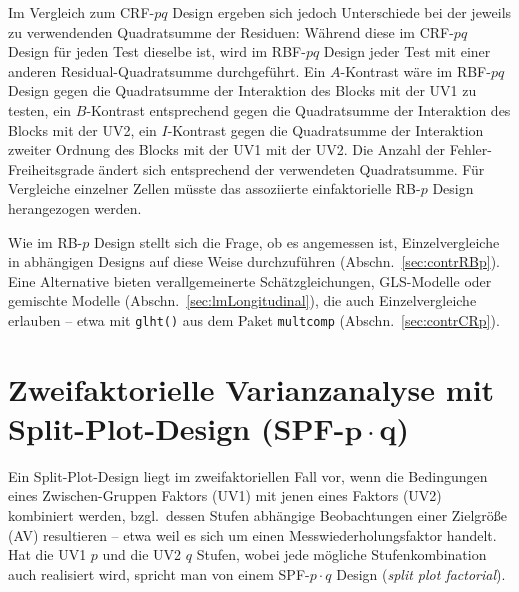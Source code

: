Im Vergleich zum CRF-$pq$ Design ergeben sich jedoch Unterschiede bei der jeweils zu verwendenden Quadratsumme der Residuen: Während diese im CRF-$pq$ Design für jeden Test dieselbe ist, wird im RBF-$pq$ Design jeder Test mit einer anderen Residual-Quadratsumme durchgeführt. Ein $A$-Kontrast wäre im RBF-$pq$ Design gegen die Quadratsumme der Interaktion des Blocks mit der UV1 zu testen, ein $B$-Kontrast entsprechend gegen die Quadratsumme der Interaktion des Blocks mit der UV2, ein $I$-Kontrast gegen die Quadratsumme der Interaktion zweiter Ordnung des Blocks mit der UV1 mit der UV2. Die Anzahl der Fehler-Freiheitsgrade ändert sich entsprechend der verwendeten Quadratsumme. Für Vergleiche einzelner Zellen müsste das assoziierte einfaktorielle RB-$p$ Design herangezogen werden.

Wie im RB-$p$ Design stellt sich die Frage, ob es angemessen ist, Einzelvergleiche in abhängigen Designs auf diese Weise durchzuführen (Abschn.\ \ref{sec:contrRBp}). Eine Alternative bieten verallgemeinerte Schätzgleichungen, GLS-Modelle oder gemischte Modelle (Abschn.\ \ref{sec:lmLongitudinal}), die auch Einzelvergleiche erlauben -- etwa mit \lstinline!glht()! aus dem Paket \lstinline!multcomp! (Abschn.\ \ref{sec:contrCRp}).

\section[Zweifaktorielle Varianzanalyse mit Split-Plot-Design (SPF-\texorpdfstring{$p \cdot q$}{p.q})]{Zweifaktorielle Varianzanalyse mit Split-Plot-Design (SPF-$\bm{p \cdot q}$)}
\label{sec:SPFpq}

Ein Split-Plot-Design liegt im zweifaktoriellen Fall vor, wenn die Bedingungen eines Zwischen-Gruppen Faktors (UV1) mit jenen eines Faktors (UV2) kombiniert werden, bzgl.\ dessen Stufen abhängige Beobachtungen einer Zielgröße (AV) resultieren -- etwa weil es sich um einen Messwiederholungsfaktor handelt. Hat die UV1 $p$ und die UV2 $q$ Stufen, wobei jede mögliche Stufenkombination auch realisiert wird, spricht man von einem SPF-$p \cdot q$ Design (\emph{split plot factorial}).

